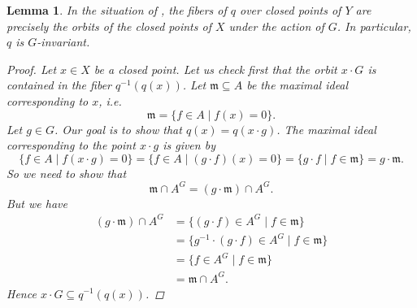 \documentclass[12pt,a4paper]{amsart}
\theoremstyle{plain}
\newtheorem{lm}[thm]{Lemma}
\theoremstyle{definition}
\theoremstyle{remark}
\begin{document}
\begin{lm}\label{lm:fibers}
  In the situation of , the fibers of $q$ over closed points of $Y$ are precisely the orbits of the closed points of $X$ under the action of $G$.
  In particular, $q$ is $G$-invariant.

  \begin{proof}
    Let $x \in X$ be a closed point.
    Let us check first that the orbit $x \cdot G$ is contained in the fiber $q^{-1}(q(x))$.
    Let $\mathfrak{m} \subseteq A$ be the maximal ideal corresponding to $x$, i.e.
    \[ \mathfrak{m} = \{ f \in A \mid f(x) = 0 \}. \]
    Let $g \in G$.
    Our goal is to show that $q(x) = q(x \cdot g)$.
    The maximal ideal corresponding to the point $x \cdot g$ is given by
    \[ \{ f \in A \mid f(x \cdot g) = 0 \} = \{ f \in A \mid (g \cdot f)(x) = 0 \} = \{ g\cdot f \mid f \in \mathfrak{m} \} = g \cdot \mathfrak{m}. \]
    So we need to show that
    \[ \mathfrak{m} \cap A^{G} = (g \cdot \mathfrak{m}) \cap A^{G}. \]
    But we have
    \begin{align*}
      (g \cdot \mathfrak{m}) \cap A^{G} & = \{ (g \cdot f) \in A^{G} \mid f \in \mathfrak{m} \} \\
      & = \{ g^{-1} \cdot (g \cdot f) \in A^{G} \mid f \in \mathfrak{m} \} \\
      & = \{ f \in A^{G} \mid f \in \mathfrak{m} \} \\
      & = \mathfrak{m} \cap A^{G}. 
    \end{align*}
    Hence $x \cdot G \subseteq q^{-1}(q(x))$.


\end{proof}
\end{lm}
\end{document}
